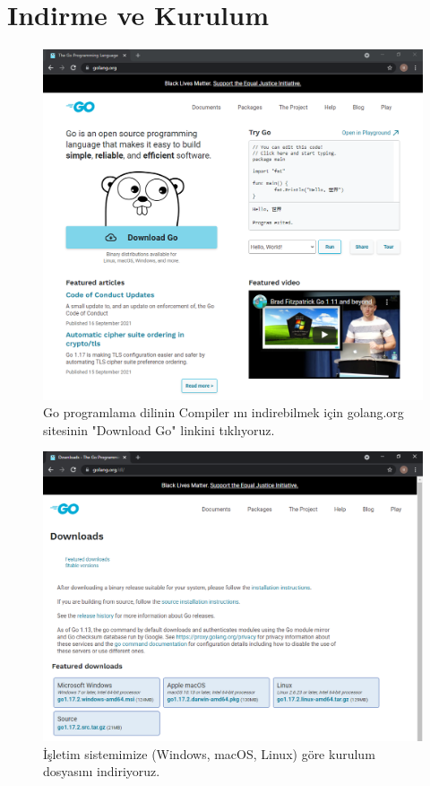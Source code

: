 \vspace{10mm}
\section{Indirme ve Kurulum}

\begin{figure}[!htb]
    \centering
    \includegraphics[width=1\linewidth]{00-images/01-download.png}
    \caption{Go programlama dilinin Compiler ını indirebilmek için golang.org sitesinin "Download Go" linkini tıklıyoruz. }
    \label{fig:my_label}
\end{figure}

\vspace{10mm}

\begin{figure}[!htb]
    \centering
    \includegraphics[width=1\linewidth]{00-images/02-download.png}
    \caption{İşletim sistemimize (Windows, macOS, Linux) göre kurulum dosyasını indiriyoruz. }
    \label{fig:my_label}
\end{figure}

